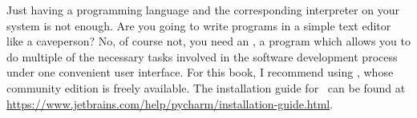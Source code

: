 %
\label{sec:installingPyCharm}%
%
Just having a programming language and the corresponding interpreter on your system is not enough.
Are you going to write programs in a simple text editor like a caveperson?
No, of course not, you need an , a program which allows you to do multiple of the necessary tasks involved in the software development process under one convenient user interface.
For this book, I recommend using \pycharm, whose community edition is freely available.
The installation guide for \pycharm\ can be found at \url{https://www.jetbrains.com/help/pycharm/installation-guide.html}.%
%
%
\FloatBarrier%
%
\FloatBarrier%
\endhsection%
%
